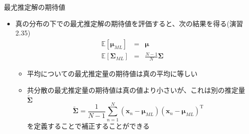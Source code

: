 \begin{frame}{最尤推定解の期待値}
 \begin{itemize}
  \item 真の分布の下での最尤推定解の期待値を評価すると、次の結果を得る(演習2.35)
        \begin{eqnarray}
         \mathbb{E}[\bm{\mu}_{ML}]&=&\bm{\mu}\\
         \mathbb{E}[\bm{\Sigma}_{ML}]&=&\frac{N-1}{N}\bm{\Sigma}
        \end{eqnarray}
        \begin{itemize}
         \item 平均についての最尤推定量の期待値は真の平均に等しい
         \item 共分散の最尤推定量の期待値は真の値より小さいが、これは別の推定量$\widetilde{\bm{\Sigma}}$
               \begin{equation}
                \widetilde{\bm{\Sigma}} = \frac{1}{N-1}\sum_{n=1}^{N}(\bm{x}_n-\bm{\mu}_{ML})(\bm{x}_n-\bm{\mu}_{ML})^{\mathrm{T}}
               \end{equation}
               を定義することで補正することができる
        \end{itemize}
 \end{itemize}
\end{frame}
